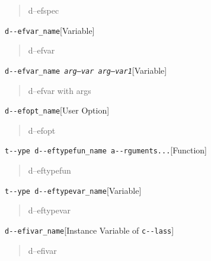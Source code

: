 \documentclass{book}
\begin{document}
\begin{titlepage}
%
\begin{quote}
\unskip{\parskip=0pt\noindent}%
d--efspec
\end{quote}

\noindent\texttt{d{-}{-}efvar\_name}\hfill[Variable]



%
\begin{quote}
\unskip{\parskip=0pt\noindent}%
d--efvar
\end{quote}

\noindent\texttt{d{-}{-}efvar\_name \EmbracOn{}\textnormal{\textsl{arg--var arg--var1}}\EmbracOff{}}\hfill[Variable]



%
\begin{quote}
\unskip{\parskip=0pt\noindent}%
d--efvar with args
\end{quote}

\noindent\texttt{d{-}{-}efopt\_name}\hfill[User Option]



%
\begin{quote}
\unskip{\parskip=0pt\noindent}%
d--efopt
\end{quote}

\noindent\texttt{t{-}{-}ype d{-}{-}eftypefun\_name a{-}{-}rguments...}\hfill[Function]



%
\begin{quote}
\unskip{\parskip=0pt\noindent}%
d--eftypefun
\end{quote}

\noindent\texttt{t{-}{-}ype d{-}{-}eftypevar\_name}\hfill[Variable]



%
\begin{quote}
\unskip{\parskip=0pt\noindent}%
d--eftypevar
\end{quote}

\noindent\texttt{d{-}{-}efivar\_name}\hfill[Instance Variable of \texttt{c{-}{-}lass}]



%
\begin{quote}
\unskip{\parskip=0pt\noindent}%
d--efivar
\end{quote}


\end{titlepage}
\end{document}
